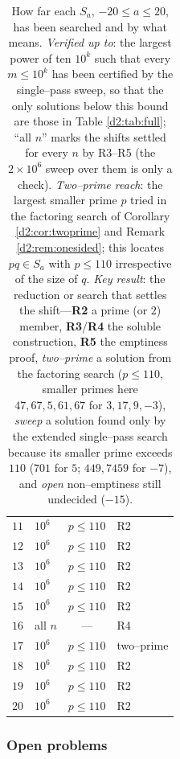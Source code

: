 \documentclass[a4paper]{article}
\theoremstyle{plain}
\theoremstyle{definition}
\theoremstyle{remark}
\newcommand{\Sa}{S_a}
\begin{document}
\begin{table}[H]
\begin{tabular}{r l c l}
$11$ & $10^{6}$ & $p\le110$ & R2 \\
$12$ & $10^{6}$ & $p\le110$ & R2 \\
$13$ & $10^{6}$ & $p\le110$ & R2 \\
$14$ & $10^{6}$ & $p\le110$ & R2 \\
$15$ & $10^{6}$ & $p\le110$ & R2 \\
$16$ & all $n$ & --- & R4 \\
$17$ & $10^{6}$ & $p\le110$ & two--prime \\
$18$ & $10^{6}$ & $p\le110$ & R2 \\
$19$ & $10^{6}$ & $p\le110$ & R2 \\
$20$ & $10^{6}$ & $p\le110$ & R2 \\
\bottomrule
\end{tabular}
\caption{How far each $S_a$, $-20\le a\le20$, has been searched and by what means. \emph{Verified up to}: the largest power of ten $10^{k}$ such that every $m\le10^{k}$ has been certified by the single--pass sweep, so that the only solutions below this bound are those in Table \ref{d2:tab:full}; ``all $n$'' marks the shifts settled for every $n$ by R3--R5 (the $2\times10^{6}$ sweep over them is only a check). \emph{Two--prime reach}: the largest smaller prime $p$ tried in the factoring search of Corollary \ref{d2:cor:twoprime} and Remark \ref{d2:rem:onesided}; this locates $pq\in\Sa$ with $p\le110$ irrespective of the size of $q$. \emph{Key result}: the reduction or search that settles the shift---\textbf{R2} a prime (or $2$) member, \textbf{R3}/\textbf{R4} the soluble construction, \textbf{R5} the emptiness proof, \emph{two--prime} a solution from the factoring search ($p\le110$, smaller primes here $47,67,5,61,67$ for $3,17,9,-3$), \emph{sweep} a solution found only by the extended single--pass search because its smaller prime exceeds $110$ ($701$ for $5$; $449,7459$ for $-7$), and \emph{open} non--emptiness still undecided ($-15$).}
\label{d2:tab:verified}
\end{table}

\subsubsection{Open problems}\label{d2:sec:open}
\end{document}
